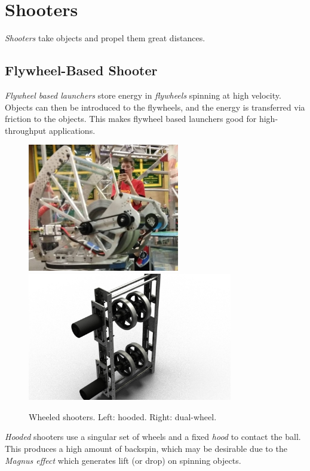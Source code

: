 \documentclass[10pt,letterpaper]{book}
\begin{document}
\section{Shooters}
\textit{Shooters} take objects and propel them great distances.
\subsection{Flywheel-Based Shooter}
\textit{Flywheel based launchers} store energy in \textit{flywheels} spinning at high velocity. Objects can then be introduced to the flywheels, and the energy is transferred via friction to the objects. This makes flywheel based launchers good for high-throughput applications.

\begin{figure}[H]
	\includegraphics[height=2.2in]{imgs/shooter_hooded.png}
	\includegraphics[height=2.2in]{imgs/shooter_dualwheel.jpeg}
	\caption{Wheeled shooters. Left: hooded. Right: dual-wheel.}
\end{figure}

\textit{Hooded} shooters use a singular set of wheels and a fixed \textit{hood} to contact the ball. This produces a high amount of backspin, which may be desirable due to the \textit{Magnus effect} which generates lift (or drop) on spinning objects.
\end{document}

